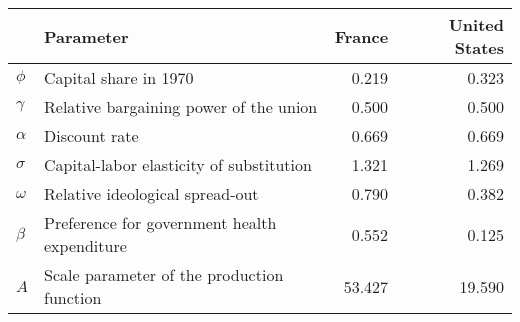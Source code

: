 
\begin{tabular}{llrr}
\toprule
\textbf{} & \textbf{Parameter} & \textbf{France} & \textbf{United States}\\
\midrule
$\phi$ & Capital share in 1970 & 0.219 & 0.323\\
$\gamma$ & Relative bargaining power of the union & 0.500 & 0.500\\
$\alpha$ & Discount rate & 0.669 & 0.669\\
$\sigma$ & Capital-labor elasticity of substitution & 1.321 & 1.269\\
$\omega$ & Relative ideological spread-out & 0.790 & 0.382\\
$\beta$ & Preference for government health expenditure & 0.552 & 0.125\\
$A$ & Scale parameter of the production function & 53.427 & 19.590\\
\bottomrule
\end{tabular}
